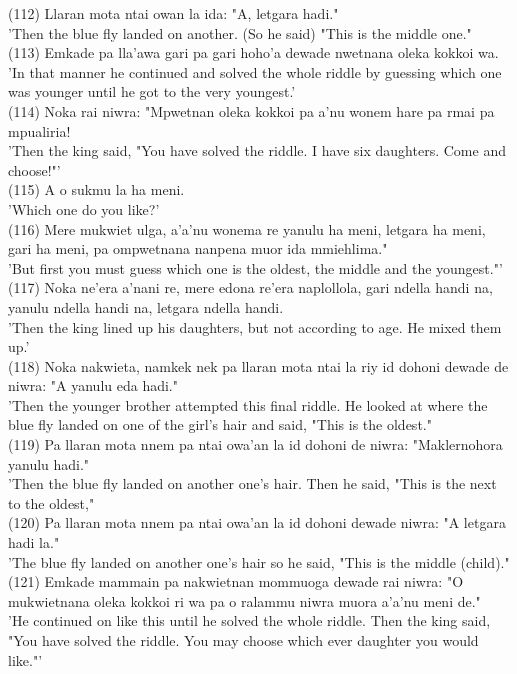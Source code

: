 \documentclass[10pt]{article}
\begin{document}
(112) Llaran mota ntai owan la ida: "A, letgara hadi."\\
'Then the blue fly landed on another. (So he said) "This is the middle one."\\
(113) Emkade pa lla'awa gari pa gari hoho'a dewade nwetnana oleka kokkoi wa.\\
'In that manner he continued and solved the whole riddle by guessing which one was younger until he got to the very youngest.'\\
(114) Noka rai niwra: "Mpwetnan oleka kokkoi pa a'nu wonem hare pa rmai pa mpualiria!\\
'Then the king said, "You have solved the riddle. I have six daughters. Come and choose!"'\\
(115) A o sukmu la ha meni.\\
'Which one do you like?'\\
(116) Mere mukwiet ulga, a'a'nu wonema re yanulu ha meni, letgara ha meni, gari ha meni, pa ompwetnana nanpena muor ida mmiehlima."\\
'But first you must guess which one is the oldest, the middle and the youngest."'\\
(117) Noka ne'era a'nani re, mere edona re'era naplollola, gari ndella handi na, yanulu ndella handi na, letgara ndella handi.\\
'Then the king lined up his daughters, but not according to age. He mixed them up.'\\
(118) Noka nakwieta, namkek nek pa llaran mota ntai la riy id dohoni dewade de niwra: "A yanulu eda hadi."\\
'Then the younger brother attempted this final riddle. He looked at where the blue fly landed on one of the girl's hair and said, "This is the oldest."\\
(119) Pa llaran mota nnem pa ntai owa'an la id dohoni de niwra: "Maklernohora yanulu hadi."\\
'Then the blue fly landed on another one's hair. Then he said, "This is the next to the oldest,"\\
(120) Pa llaran mota nnem pa ntai owa'an la id dohoni dewade niwra: "A letgara hadi la."\\
'The blue fly landed on another one's hair so he said, "This is the middle (child)."\\
(121) Emkade mammain pa nakwietnan mommuoga dewade rai niwra: "O mukwietnana oleka kokkoi ri wa pa o ralammu niwra muora a'a'nu meni de."\\
'He continued on like this until he solved the whole riddle. Then the king said, "You have solved the riddle. You may choose which ever daughter you would like."'\\
\end{document}
